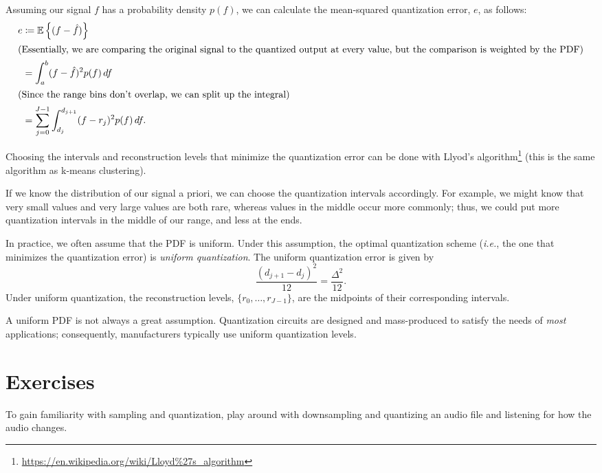 \documentclass[11pt]{article}
\newcommand{\ie}{\emph{i.e.}}
\begin{document}
Assuming our signal $f$ has a probability density $p(f)$, we can calculate the mean-squared quantization error, $e$, as follows:
\begin{align}
    e &\coloneqq \mathbb{E}\left\{ (f - \hat{f}) \right\} \\
    \shortintertext{(Essentially, we are comparing the original signal to the quantized output at every value, but the comparison is weighted by the PDF)}
    &= \int_a^b (f - \hat{f})^2 p(f) \, df \\
    \shortintertext{(Since the range bins don't overlap, we can split up the integral)}
    &= \sum_{j=0}^{J-1} \int_{d_j}^{d_{j+1}} (f - r_j)^2 p(f) \, df.
\end{align}

Choosing the intervals and reconstruction levels that minimize the quantization error can be done with Llyod's algorithm\footnote{\href{https://en.wikipedia.org/wiki/Lloyd\%27s_algorithm}{https://en.wikipedia.org/wiki/Lloyd\%27s\_algorithm}} (this is the same algorithm as k-means clustering).

If we know the distribution of our signal a priori, we can choose the quantization intervals accordingly. For example, we might know that very small values and very large values are both rare, whereas values in the middle occur more commonly; thus, we could put more quantization intervals in the middle of our range, and less at the ends.

In practice, we often assume that the PDF is uniform. Under this assumption, the optimal quantization scheme (\ie, the one that minimizes the quantization error) is \emph{uniform quantization}. The uniform quantization error is given by
\begin{equation}
    \frac{(d_{j+1} - d_j)^2}{12} = \frac{\Delta^2}{12}.
\end{equation}
Under uniform quantization, the reconstruction levels, $\{r_0,\dotsc,r_{J-1}\}$, are the midpoints of their corresponding intervals.


A uniform PDF is not always a great assumption. Quantization circuits are designed and mass-produced to satisfy the needs of \emph{most} applications; consequently, manufacturers typically use uniform quantization levels.

\section{Exercises}

To gain familiarity with sampling and quantization, play around with downsampling and quantizing an audio file and listening for how the audio changes.
\end{document}
